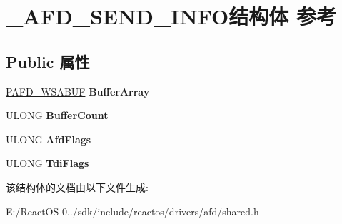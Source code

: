 \hypertarget{struct___a_f_d___s_e_n_d___i_n_f_o}{}\section{\+\_\+\+A\+F\+D\+\_\+\+S\+E\+N\+D\+\_\+\+I\+N\+F\+O结构体 参考}
\label{struct___a_f_d___s_e_n_d___i_n_f_o}
\subsection*{Public 属性}
\begin{DoxyCompactItemize}
\item 
\mbox{\label{struct___a_f_d___s_e_n_d___i_n_f_o_a0a87fcd905fc6baf9c56723e1c0fc79e}} 
\hyperlink{struct___a_f_d___w_s_a_b_u_f}{P\+A\+F\+D\+\_\+\+W\+S\+A\+B\+UF} {\bfseries Buffer\+Array}
\item 
\mbox{\label{struct___a_f_d___s_e_n_d___i_n_f_o_a047a827101ec1e8d3ee7a53d9d762da4}} 
U\+L\+O\+NG {\bfseries Buffer\+Count}
\item 
\mbox{\label{struct___a_f_d___s_e_n_d___i_n_f_o_afc1815b0061955a602a1a61e96a813f0}} 
U\+L\+O\+NG {\bfseries Afd\+Flags}
\item 
\mbox{\label{struct___a_f_d___s_e_n_d___i_n_f_o_a8b2c1d6187d194fa3a133c6e5c5e07cd}} 
U\+L\+O\+NG {\bfseries Tdi\+Flags}
\end{DoxyCompactItemize}


该结构体的文档由以下文件生成\+:\begin{DoxyCompactItemize}
\item 
E\+:/\+React\+O\+S-\/0../sdk/include/reactos/drivers/afd/shared.\+h\end{DoxyCompactItemize}
